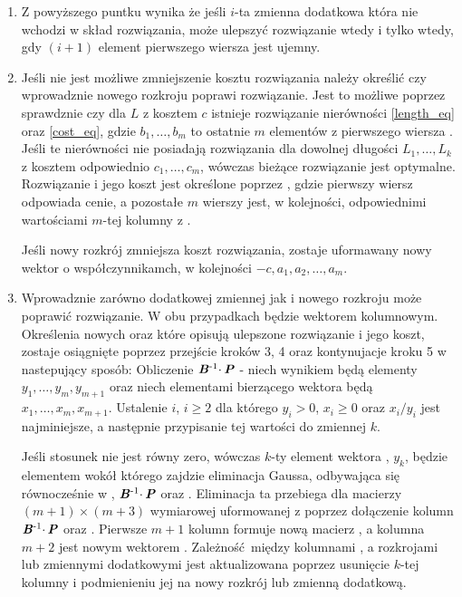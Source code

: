 \begin{enumerate}
\item Z powyższego puntku wynika że jeśli $i$-ta zmienna dodatkowa która nie wchodzi w skład rozwiązania, może ulepszyć rozwiązanie wtedy i tylko wtedy, gdy $(i+1)$ element pierwszego wiersza  jest ujemny.

\item Jeśli nie jest możliwe zmniejszenie kosztu rozwiązania należy określić czy wprowadznie nowego rozkroju poprawi rozwiązanie. Jest to możliwe poprzez sprawdznie czy dla $L$ z kosztem $c$ istnieje rozwiązanie nierówności \ref{length_eq} oraz \ref{cost_eq}, gdzie $b_1,\dots,b_m$ to ostatnie $m$ elementów z pierwszego wiersza . Jeśli te nierówności nie posiadają rozwiązania dla dowolnej długości $L_1,\dots,L_k$ z kosztem odpowiednio $c_1,\dots,c_m$, wówczas bieżące rozwiązanie jest optymalne. Rozwiązanie i jego koszt jest określone poprzez , gdzie pierwszy wiersz odpowiada cenie, a pozostałe $m$ wierszy jest, w kolejności, odpowiednimi wartościami $m$-tej kolumny z .

Jeśli nowy rozkrój zmniejsza koszt rozwiązania, zostaje uformawany nowy wektor  o współczynnikamch, w kolejności $-c,a_1,a_2,\dots,a_m$.

\item Wprowadznie zarówno dodatkowej zmiennej jak i nowego rozkroju może poprawić rozwiązanie. W obu przypadkach  będzie wektorem kolumnowym. Określenia nowych  oraz  które opisują ulepszone rozwiązanie i jego koszt, zostaje osiągnięte poprzez przejście kroków 3, 4 oraz kontynujacje kroku 5 w nastepujący sposób: Obliczenie $\textbf{\textit{B}}\textsuperscript{-1} \cdotp \textbf{\textit{P}}$ - niech wynikiem będą elementy $y_1,\dots,y_m,y_{m+1}$ oraz niech elementami bierzącego wektora  będą $x_1,\dots,x_m,x_{m+1}$. Ustalenie $i$, $ i \ge 2$ dla którego $y_i > 0$, $x_i \ge 0$ oraz $x_i/y_i$ jest najminiejsze, a następnie przypisanie tej wartości do zmiennej $k$.

Jeśli stosunek nie jest równy zero, wówczas $k$-ty element wektora , $y_k$, będzie elementem wokół którego zajdzie eliminacja Gaussa, odbywająca się równocześnie w , $\textbf{\textit{B}}\textsuperscript{-1} \cdotp \textbf{\textit{P}}$ oraz . Eliminacja ta przebiega dla macierzy $(m+1) \times (m+3)$ wymiarowej  uformowanej z  poprzez dołączenie kolumn $\textbf{\textit{B}}\textsuperscript{-1} \cdotp \textbf{\textit{P}}$ oraz . Pierwsze $m+1$ kolumn  formuje nową macierz , a kolumna $m+2$ jest nowym wektorem . Zależność między kolumnami , a rozkrojami lub zmiennymi dodatkowymi jest aktualizowana poprzez usunięcie $k$-tej kolumny i podmienieniu jej na nowy rozkrój lub zmienną dodatkową.

\end{enumerate}

